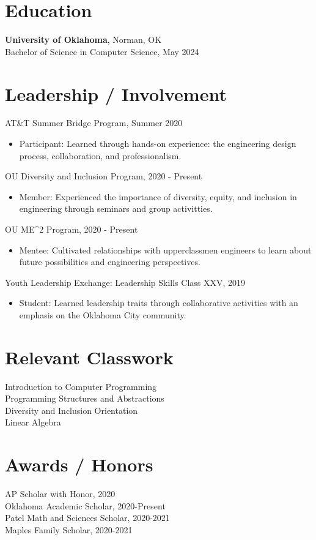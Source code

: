 \documentclass[12pt]{article}
\begin{document}
\section*{Education}
\textbf{University of Oklahoma}, Norman, OK \\
Bachelor of Science in Computer Science, May 2024 

\section*{Leadership / Involvement}
AT\&T Summer Bridge Program, Summer 2020 
\begin{itemize}
\item Participant: Learned through hands-on experience: the engineering design process, collaboration,  and professionalism.
\end{itemize}

OU Diversity and Inclusion Program, 2020 - Present 
\begin{itemize}
\item Member: Experienced the importance of diversity, equity, and inclusion in engineering through seminars and group activitties.
\end{itemize}

OU ME\textasciicircum{}2 Program, 2020 - Present 
\begin{itemize}
\item Mentee: Cultivated relationships with upperclassmen engineers to learn about future possibilities and engineering perspectives.
\end{itemize}

Youth Leadership Exchange: Leadership Skills Class XXV, 2019 
\begin{itemize}
\item Student: Learned leadership traits through collaborative activities with an emphasis on the Oklahoma City community.
\end{itemize}

\begin{multicols}{2}
\section*{Relevant Classwork}
Introduction to Computer Programming  \\
Programming Structures and Abstractions \\
Diversity and Inclusion Orientation \\
Linear Algebra

\section*{Awards / Honors}
AP Scholar with Honor, 2020 \\
Oklahoma Academic Scholar, 2020-Present \\
Patel Math and Sciences Scholar, 2020-2021 \\
Maples Family Scholar, 2020-2021 
\end{multicols}
\end{document}
